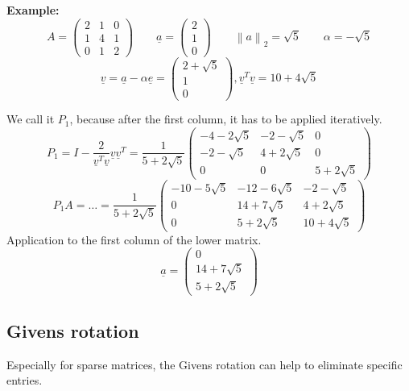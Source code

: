 \documentclass{article}
\newcommand{\norm}[1]{\left\|#1\right\|}
\begin{document}
\textbf{Example:}
\[
  A = \begin{pmatrix}  2 & 1 & 0 \\ 1 & 4 & 1 \\ 0 & 1 & 2  \end{pmatrix}
  \qquad
  \underline{a} = \begin{pmatrix} 2 \\ 1 \\ 0 \end{pmatrix}
  \qquad
  \norm{a}_2 = \sqrt{5}
  \qquad
  \alpha = -\sqrt{5}
\] \[
  \underline{v} = \underline{a} - \alpha \underline{e} = \begin{pmatrix} 2 + \sqrt{5} \\ 1 \\ 0 \end{pmatrix},
  \underline{v}^T \underline{v} = 10 + 4 \sqrt{5}
\]

We call it $P_1$, because after the first column, it has to be applied iteratively.
\[
  P_1 = I - \frac{2}{\underline{v}^T \underline{v}} \underline{v} \underline{v}^T = \frac{1}{5 + 2\sqrt{5}}
  \begin{pmatrix}
    -4 - 2\sqrt{5} & -2-\sqrt{5} & 0 \\
    -2-\sqrt{5} & 4 + 2\sqrt{5} & 0 \\
    0 & 0 & 5 + 2\sqrt{5}
  \end{pmatrix}
\] \[
  P_1 A = \ldots = \frac{1}{5 + 2\sqrt{5}} \begin{pmatrix}
    -10 - 5 \sqrt{5} & -12 -6\sqrt{5} & -2-\sqrt{5} \\
    0 & 14 + 7\sqrt{5} & 4 + 2\sqrt{5} \\
    0 & 5 + 2\sqrt{5} & 10 + 4\sqrt{5}
  \end{pmatrix}
\]
Application to the first column of the lower matrix.
\[ \underline{a} = \begin{pmatrix} 0 \\ 14 + 7\sqrt{5} \\ 5 + 2\sqrt{5} \end{pmatrix} \]

\subsection{Givens rotation}
%
Especially for sparse matrices, the Givens rotation can help to eliminate specific entries.
\end{document}
